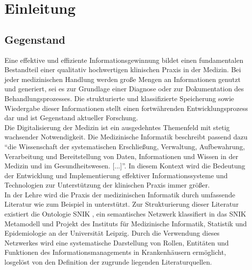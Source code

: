 \chapter{Einleitung}\label{ch:introduction}
\section{Gegenstand}\label{sec:gegenstand}
Eine effektive und effiziente Informationsgewinnung bildet einen fundamentalen Bestandteil einer qualitativ hochwertigen klinischen Praxis in der Medizin. 
Bei jeder medizinischen Handlung werden große Mengen an Informationen genutzt und generiert, sei es zur Grundlage einer Diagnose oder zur Dokumentation des Behandlungsprozesses. 
Die strukturierte und klassifizierte Speicherung sowie Wiedergabe dieser Informationen stellt einen fortwährenden Entwicklungsprozess dar und ist Gegenstand aktueller Forschung.\\

Die Digitalisierung der Medizin ist ein ausgedehntes Themenfeld mit stetig wachsender Notwendigkeit. 
Die Medizinische Informatik beschreibt passend dazu \enquote{die Wissenschaft der systematischen Erschließung, Verwaltung, Aufbewahrung, Verarbeitung und Bereitstellung von Daten, Informationen und Wissen in der Medizin und im Gesundheitswesen. [...]}\citep{gmds}.
In diesem Kontext wird die Bedeutung der Entwicklung und Implementierung effektiver Informationssysteme und Technologien zur Unterstützung der klinischen Praxis immer größer.\\

In der Lehre wird die Praxis der medizinischen Informatik durch umfassende Literatur wie zum Beispiel in \citet{bb} unterstützt.
Zur Strukturierung dieser Literatur existiert die Ontologie SNIK \citep{snikgraphposter}, ein semantisches Netzwerk klassifiert in das SNIK Metamodell und Projekt des Instituts für Medizinische Informatik, Statistik und Epidemiologie \citep{imise} an der Universität Leipzig.
Durch die Verwendung dieses Netzwerkes wird eine systematische Darstellung von Rollen, Entitäten und Funktionen des Informationsmanagements in Krankenhäusern ermöglicht, losgelöst von den Definition der zugrunde liegenden Literaturquellen.\\

